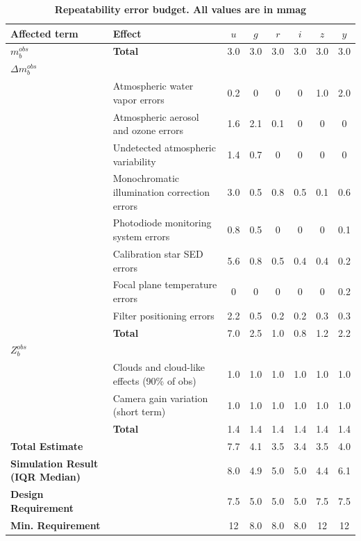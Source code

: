 \documentclass[12pt,preprint]{aastex}
\begin{document}
\begin{landscape}
\begin{center}
\begin{table}[htb]
\caption{{\bf Repeatability error budget.  All values are in mmag} }
\begin{tabular}{l | l | c c c c c c }
Affected term & Effect &  $u$  & $g$ & $r$ & $i$ & $z$ & $y$ \\ \hline
{\bf $m_b^{obs}$} & {\bf Total} & 3.0 & 3.0 & 3.0 & 3.0 & 3.0 & 3.0 \\ \hline
{\bf $\Delta m_b^{obs}$} & & & & \\
& Atmospheric water vapor errors & 0.2 & 0 & 0 & 0 & 1.0 & 2.0  \\
& Atmospheric aerosol and ozone errors & 1.6 & 2.1 & 0.1 & 0 & 0 & 0  \\
& Undetected atmospheric variability & 1.4 & 0.7 & 0 & 0 & 0 & 0 \\
& Monochromatic illumination correction errors & 3.0 & 0.5 & 0.8 & 0.5 & 0.1 & 0.6\\
& Photodiode monitoring system errors & 0.8 & 0.5 & 0 & 0 & 0 & 0.1 \\
& Calibration star SED errors & 5.6 & 0.8 & 0.5 & 0.4 & 0.4 & 0.2 \\
& Focal plane temperature errors & 0 & 0 & 0 & 0 & 0 & 0.2 \\
& Filter positioning errors & 2.2 & 0.5 & 0.2 & 0.2 & 0.3 & 0.3 \\ 
& {\bf Total} & 7.0 & 2.5 & 1.0 & 0.8 & 1.2 & 2.2 \\ \hline
$Z_b^{obs}$ & & & & \\
& Clouds and cloud-like effects (90\% of obs) & 1.0 & 1.0 & 1.0 & 1.0 & 1.0 & 1.0 \\
& Camera gain variation (short term) & 1.0 & 1.0 & 1.0 & 1.0 & 1.0 & 1.0 \\
& {\bf Total} & 1.4 & 1.4 & 1.4 & 1.4 & 1.4 & 1.4 \\ \hline
{\bf Total Estimate} & & 7.7 & 4.1 & 3.5 & 3.4 & 3.5 & 4.0 \\ 
{\bf Simulation Result (IQR Median)} & & 8.0 & 4.9 & 5.0 & 5.0 & 4.4 & 6.1 \\ \hline
{\bf Design Requirement} & & 7.5 & 5.0 & 5.0 & 5.0 & 7.5 & 7.5 \\ 
{\bf Min. Requirement} & & 12 & 8.0 & 8.0 & 8.0 & 12 & 12 \\
\end{tabular}
\label{tab:rpt_error_budget}
\end{table}
\end{center}
\end{landscape}
\end{document}
